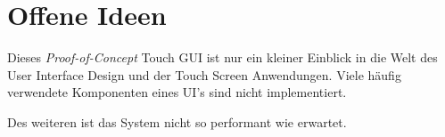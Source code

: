 \documentclass[a4paper,singleside,12pt,titlepage]{scrartcl}
\begin{document}
	\section{}
	
	
	
	
	
	\section{Offene Ideen}
		Dieses \emph{Proof-of-Concept} Touch GUI ist nur ein kleiner Einblick in die Welt des User Interface Design und der Touch Screen Anwendungen.
		Viele häufig verwendete Komponenten eines UI's sind nicht implementiert.
		
		Des weiteren ist das System nicht so performant wie erwartet.
	
	\cite{stm32-base}
	\cite{stm32-ts}
	\cite{ts-holzinger}
	
	\newpage
	\printbibliography[heading=bibnumbered]
\end{document}
